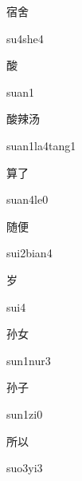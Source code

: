 \begin{verbete}[su4she4]{宿舍}
\begin{pronuncia}{su4she4}
\end{pronuncia}
\end{verbete}

\begin{verbete}[suan1]{酸}
\begin{pronuncia}{suan1}
\end{pronuncia}
\end{verbete}

\begin{verbete}{酸辣汤}
\begin{pronuncia}{suan1la4tang1}
\end{pronuncia}
\end{verbete}

\begin{verbete}[suan4le0]{算了}
\begin{pronuncia}{suan4le0}
\end{pronuncia}
\end{verbete}

\begin{verbete}{随便}
\begin{pronuncia}{sui2bian4}
\end{pronuncia}
\end{verbete}

\begin{verbete}[sui4]{岁}
\begin{pronuncia}{sui4}
\end{pronuncia}
\end{verbete}

\begin{verbete}{孙女}
\begin{pronuncia}{sun1nur3}
\end{pronuncia}
\end{verbete}

\begin{verbete}[sun1zi0]{孙子}
\begin{pronuncia}{sun1zi0}
\end{pronuncia}
\end{verbete}

\begin{verbete}[suo3yi3]{所以}
\begin{pronuncia}{suo3yi3}
\end{pronuncia}
\end{verbete}

